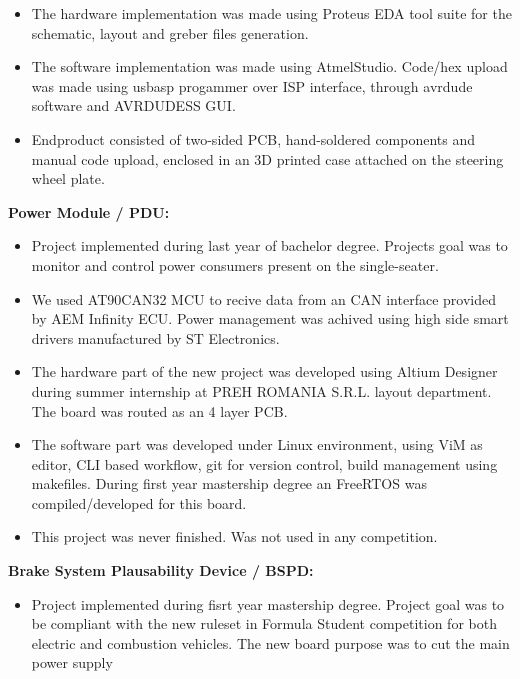 \documentclass{resume}
\begin{document}
\begin{resume}
\begin{itemize}
        Additional push-buttons were used for gear shifting, and radio communication with the paddock.
        Same CAN interface was used to exchange data between other electronic module present inside the vehicle.
        \item The hardware implementation was made using Proteus EDA tool suite for the schematic, layout
        and greber files generation.
        \item The software implementation was made using AtmelStudio.
        Code/hex upload was made using usbasp progammer over ISP interface, through avrdude software
        and AVRDUDESS GUI.
        \item Endproduct consisted of two-sided PCB, hand-soldered components and manual code upload, 
        enclosed in an 3D printed case attached on the steering wheel plate.
    \end{itemize}
    {\bf Power Module / PDU: }
    \begin{itemize}
        \item Project implemented during last year of bachelor degree.
        Projects goal was to monitor and control power consumers present on the single-seater.
        \item We used AT90CAN32 MCU to recive data from an CAN interface provided by AEM Infinity ECU.
        Power management was achived using high side smart drivers manufactured by ST Electronics.
        \item The hardware part of the new project was developed using Altium Designer during summer internship
        at PREH ROMANIA S.R.L. layout department. The board was routed as an 4 layer PCB.
        \item The software part was developed under Linux environment, using ViM as editor, CLI based workflow,
        git for version control, build management using makefiles. 
        During first year mastership degree an FreeRTOS was compiled/developed for this board.
        \item This project was never finished. Was not used in any competition.
    \end{itemize}
    {\bf Brake System Plausability Device / BSPD: }
    \begin{itemize}
        \item Project implemented during fisrt year mastership degree.
        Project goal was to be compliant with the new ruleset in Formula Student competition 
        for both electric and combustion vehicles. The new board purpose was to cut the main power supply

\end{itemize}
\end{resume}
\end{document}
